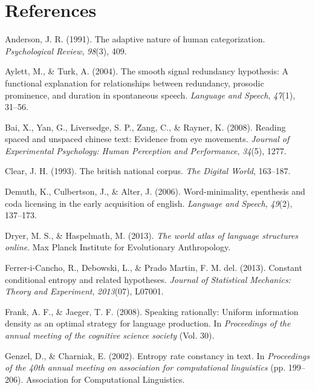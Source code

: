 \documentclass[10pt, letterpaper]{article}
\begin{document}
\hypertarget{references}{%
\section{References}\label{references}}

\setlength{\parindent}{-0.1in} 
\setlength{\leftskip}{0.125in}

\noindent

\hypertarget{refs}{}
\leavevmode\hypertarget{ref-anderson1991}{}%
Anderson, J. R. (1991). The adaptive nature of human categorization.
\emph{Psychological Review}, \emph{98}(3), 409.

\leavevmode\hypertarget{ref-aylett2004}{}%
Aylett, M., \& Turk, A. (2004). The smooth signal redundancy hypothesis:
A functional explanation for relationships between redundancy, prosodic
prominence, and duration in spontaneous speech. \emph{Language and
Speech}, \emph{47}(1), 31--56.

\leavevmode\hypertarget{ref-bai2008}{}%
Bai, X., Yan, G., Liversedge, S. P., Zang, C., \& Rayner, K. (2008).
Reading spaced and unspaced chinese text: Evidence from eye movements.
\emph{Journal of Experimental Psychology: Human Perception and
Performance}, \emph{34}(5), 1277.

\leavevmode\hypertarget{ref-clear1993}{}%
Clear, J. H. (1993). The british national corpus. \emph{The Digital
World}, 163--187.

\leavevmode\hypertarget{ref-demuth2006}{}%
Demuth, K., Culbertson, J., \& Alter, J. (2006). Word-minimality,
epenthesis and coda licensing in the early acquisition of english.
\emph{Language and Speech}, \emph{49}(2), 137--173.

\leavevmode\hypertarget{ref-dryer2013}{}%
Dryer, M. S., \& Haspelmath, M. (2013). \emph{The world atlas of
language structures online}. Max Planck Institute for Evolutionary
Anthropology.

\leavevmode\hypertarget{ref-ferrer-i-cancho2013}{}%
Ferrer-i-Cancho, R., Debowski, L., \& Prado Martin, F. M. del. (2013).
Constant conditional entropy and related hypotheses. \emph{Journal of
Statistical Mechanics: Theory and Experiment}, \emph{2013}(07), L07001.

\leavevmode\hypertarget{ref-frank2008}{}%
Frank, A. F., \& Jaeger, T. F. (2008). Speaking rationally: Uniform
information density as an optimal strategy for language production. In
\emph{Proceedings of the annual meeting of the cognitive science
society} (Vol. 30).

\leavevmode\hypertarget{ref-genzel2002}{}%
Genzel, D., \& Charniak, E. (2002). Entropy rate constancy in text. In
\emph{Proceedings of the 40th annual meeting on association for
computational linguistics} (pp. 199--206). Association for Computational
Linguistics.
\end{document}

